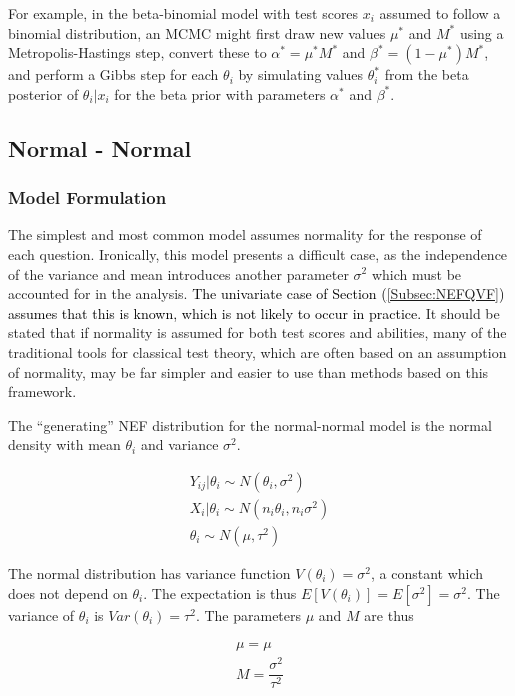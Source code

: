 \documentclass[12pt,epsfig]{article}
\newcommand{\change}[1]{\textcolor{black}{#1}}
\begin{document}
For example, in the beta-binomial model with test scores $x_i$ assumed to follow a binomial distribution, an MCMC might first draw new values $\mu^*$ and $M^*$ using a Metropolis-Hastings step, convert these to $\alpha^* = \mu^* M^*$ and $\beta^* = (1 - \mu^*) M^*$, and perform a Gibbs step for each $\theta_i$ by simulating values $\theta^*_i$ from the beta posterior of $\theta_i | x_i$ for the beta prior with parameters $\alpha^*$ and $\beta^*$.

\subsection{Normal - Normal}

\subsubsection{Model Formulation}

The simplest and most common model assumes normality for the response of each question. Ironically, this model presents a difficult case, as the independence of the variance and mean introduces another parameter $\sigma^2$ which must be accounted for in the analysis. \change{The univariate case of Section (\ref{Subsec:NEFQVF}) assumes that this is known, which is not likely to occur in practice.} It should be stated that if normality is assumed for both test scores and abilities, many of the traditional tools for classical test theory, which are often based on an assumption of normality, may be far simpler and easier to use than methods based on this framework.

The ``generating'' NEF distribution for the normal-normal model is the normal density with mean $\theta_i$ and variance $\sigma^2$.

\begin{gather*}
    Y_{ij} | \theta_i \sim N(\theta_i, \sigma^2)\\
    X_{i} | \theta_i \sim N(n_i \theta_i, n_i\sigma^2)\\
    \theta_i \sim N(\mu, \tau^2)
\end{gather*}

\noindent  The normal distribution has variance function $V(\theta_i) = \sigma^2$, a constant which does not depend on $\theta_i$. The expectation is thus $E[V(\theta_i)] = E[\sigma^2] = \sigma^2$. The variance of $\theta_i$ is $Var(\theta_i) = \tau^2$. The parameters $\mu$ and $M$ are thus

\begin{align*}
    \mu = \mu\\
    M = \dfrac{\sigma^2}{\tau^2}\\
\end{align*}
\end{document}
